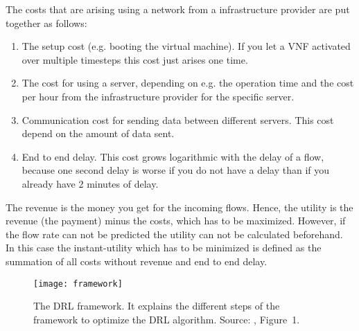 The costs that are arising using a network from a infrastructure provider are put together as follows:
\begin{enumerate}
\item The setup cost (e.g. booting the virtual machine). If you let a VNF activated over multiple timesteps this cost just arises one time.
\item The cost for using a server, depending on e.g. the operation time and the cost per hour from the infrastructure provider for the specific server.

\item Communication cost for sending data between different servers. This cost depend on the amount of data sent.
\item End to end delay. This cost grows logarithmic with the delay of a flow, because one second delay is worse if you do not have a delay than if you already have 2 minutes of delay.
\end{enumerate}
The revenue is the money you get for the incoming flows. Hence, the utility is the revenue (the payment) minus the costs, which has to be maximized. However, if the flow rate can not be predicted the utility can not be calculated beforehand. In this case the instant-utility which has to be minimized is defined as the summation of all costs without revenue and end to end delay.


\begin{figure*}[t]
\label{fig:framework}
\centering
\texttt{[image: framework]}
\caption{The DRL framework. It explains the different steps of the framework to optimize the DRL algorithm. Source: \cite{Gu}, Figure~1.}
\end{figure*}
